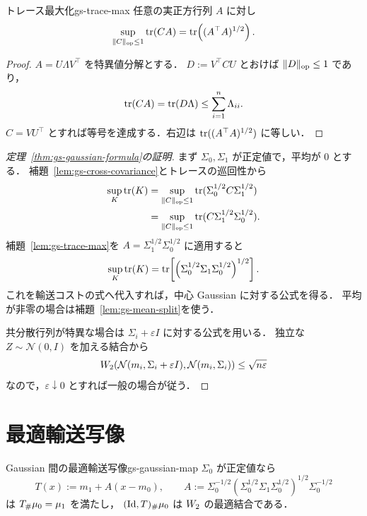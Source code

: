 \begin{lemma}{トレース最大化}{gs-trace-max}
  任意の実正方行列 $A$ に対し
  \[
    \sup_{\lVert C \rVert_{\mathrm{op}}\leq1}\operatorname{tr}(CA)
    =
    \operatorname{tr}\!\left((A^\top A)^{1/2}\right).
  \]
\end{lemma}

\begin{proof}
  $A=U\Lambda V^\top$ を特異値分解とする．
  $D:=V^\top C U$ とおけば $\lVert D \rVert_{\mathrm{op}}\leq1$ であり，
  \[
    \operatorname{tr}(CA)=\operatorname{tr}(D\Lambda)
    \leq\sum_{i=1}^n\Lambda_{ii}.
  \]
  $C=VU^\top$ とすれば等号を達成する．右辺は
  $\operatorname{tr}((A^\top A)^{1/2})$ に等しい．
\end{proof}

\begin{proof}[定理~\ref{thm:gs-gaussian-formula}の証明]
  まず $\Sigma_0,\Sigma_1$ が正定値で，平均が $0$ とする．
  補題~\ref{lem:gs-cross-covariance}とトレースの巡回性から
  \[
    \begin{aligned}
      \sup_K\operatorname{tr}(K)
      &=
      \sup_{\lVert C \rVert_{\mathrm{op}}\leq1}
      \operatorname{tr}(\Sigma_0^{1/2}C\Sigma_1^{1/2}) \\
      &=
      \sup_{\lVert C \rVert_{\mathrm{op}}\leq1}
      \operatorname{tr}(C\Sigma_1^{1/2}\Sigma_0^{1/2}).
    \end{aligned}
  \]
  補題~\ref{lem:gs-trace-max}を
  $A=\Sigma_1^{1/2}\Sigma_0^{1/2}$ に適用すると
  \[
    \sup_K\operatorname{tr}(K)
    =
    \operatorname{tr}\!\left[
      \left(
        \Sigma_0^{1/2}\Sigma_1\Sigma_0^{1/2}
      \right)^{1/2}
    \right].
  \]
  これを輸送コストの式へ代入すれば，中心 Gaussian に対する公式を得る．
  平均が非零の場合は補題~\ref{lem:gs-mean-split}を使う．

  共分散行列が特異な場合は
  $\Sigma_i+\varepsilon I$ に対する公式を用いる．
  独立な $Z\sim\mathcal{N}(0,I)$ を加える結合から
  \[
    W_2\!\left(
      \mathcal{N}(m_i,\Sigma_i+\varepsilon I),
      \mathcal{N}(m_i,\Sigma_i)
    \right)
    \leq\sqrt{n\varepsilon}
  \]
  なので，$\varepsilon\downarrow0$ とすれば一般の場合が従う．
\end{proof}

\section{最適輸送写像}
\label{sec:gaussian-map}

\begin{proposition}{Gaussian 間の最適輸送写像}{gs-gaussian-map}
  $\Sigma_0$ が正定値なら
  \[
    T(x)
    :=
    m_1+A(x-m_0),
    \qquad
    A
    :=
    \Sigma_0^{-1/2}
    \left(
      \Sigma_0^{1/2}\Sigma_1\Sigma_0^{1/2}
    \right)^{1/2}
    \Sigma_0^{-1/2}
  \]
  は $T_\#\mu_0=\mu_1$ を満たし，
  $(\mathrm{Id},T)_\#\mu_0$ は $W_2$ の最適結合である．
\end{proposition}

